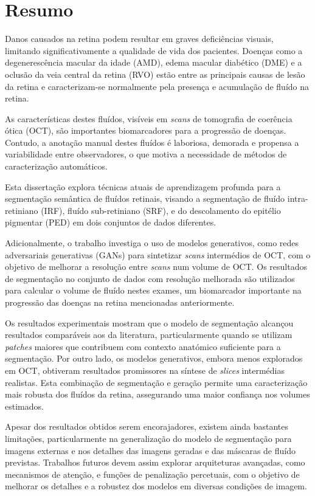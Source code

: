 \chapter*{Resumo}
Danos causados na retina podem resultar em graves deficiências visuais, limitando  significativamente a qualidade de vida dos pacientes. Doenças como a degenerescência macular da idade (AMD), edema macular diabético (DME) e a oclusão da veia central da retina (RVO) estão entre as principais causas de lesão da retina e caracterizam-se normalmente pela presença e acumulação de fluído na retina.
\par
As características destes fluídos, visíveis em \textit{scans} de tomografia de coerência ótica (OCT), são importantes biomarcadores para a progressão de doenças. Contudo, a anotação manual destes fluídos é laboriosa, demorada e propensa a variabilidade entre observadores, o que motiva a necessidade de métodos de caracterização automáticos.
\par
Esta dissertação explora técnicas atuais de aprendizagem profunda para a segmentação semântica de fluídos retinais, visando a segmentação de fluído intra-retiniano (IRF), fluído sub-retiniano (SRF), e do descolamento do epitélio pigmentar (PED) em dois conjuntos de dados diferentes.
\par
Adicionalmente, o trabalho investiga o uso de modelos generativos, como redes adversariais generativas (GANs) para sintetizar \textit{scans} intermédios de OCT, com o objetivo de melhorar a resolução entre \textit{scans} num volume de OCT. Os resultados de segmentação no conjunto de dados com resolução melhorada são utilizados para calcular o volume de fluído nestes exames, um biomarcador importante na progressão das doenças na retina mencionadas anteriormente.
\par
Os resultados experimentais mostram que o modelo de segmentação alcançou resultados comparáveis aos da literatura, particularmente quando se utilizam \textit{patches} maiores que contribuem com contexto anatómico suficiente para a segmentação. Por outro lado, os modelos generativos, embora menos explorados em OCT, obtiveram resultados promissores na síntese de \textit{slices} intermédias realistas. Esta combinação de segmentação e geração permite uma caracterização mais robusta dos fluídos da retina, assegurando uma maior confiança nos volumes estimados.
\par
Apesar dos resultados obtidos serem encorajadores, existem ainda bastantes limitações, particularmente na generalização do modelo de segmentação para imagens externas e nos detalhes das imagens geradas e das máscaras de fluído previstas. Trabalhos futuros devem assim explorar arquiteturas avançadas, como mecanismos de atenção, e funções de penalização percetuais, com o objetivo de melhorar os detalhes e a robustez dos modelos em diversas condições de imagem.

